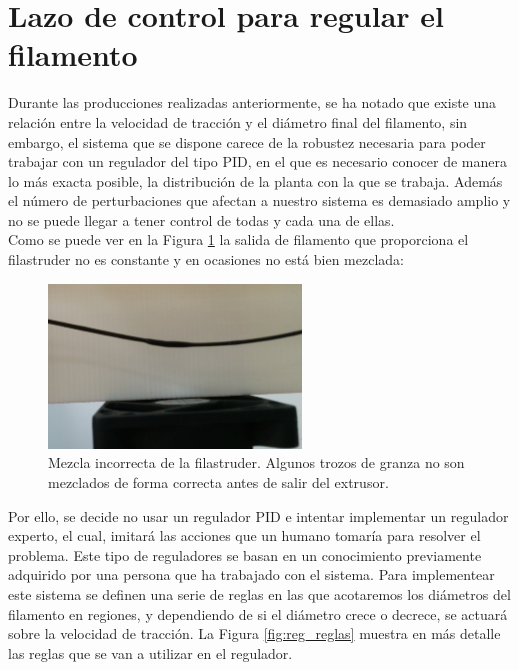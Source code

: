 \section{Lazo de control para regular el filamento}
\label{sec:reg_expt}

Durante las producciones realizadas anteriormente, se ha notado que existe una relación entre la velocidad de tracción y el diámetro final del filamento, sin embargo, el sistema que se dispone carece de la robustez necesaria para poder trabajar con un regulador del tipo PID, en el que es necesario conocer de manera lo más exacta posible, la distribución de la planta con la que se trabaja. Además el número de perturbaciones que afectan a nuestro sistema es demasiado amplio y no se puede llegar a tener control de todas y cada una de ellas.\\

Como se puede ver en la Figura \ref{fig:reg_mezcla} la salida de filamento que proporciona el filastruder no es constante y en ocasiones no está bien mezclada:

\begin{figure}[H]
    \centering
    \includegraphics[width=0.6\textwidth]{images/producciones/22072015/IMG_20150722_120959.jpg}
    \caption[Mezcla incorrecta de la filastruder.]{Mezcla incorrecta de la filastruder. Algunos trozos de granza no son mezclados de forma correcta antes de salir del extrusor.}
    \label{fig:reg_mezcla}
\end{figure}

Por ello, se decide no usar un regulador PID e intentar implementar un regulador experto, el cual, imitará las acciones que un humano tomaría para resolver el problema. Este tipo de reguladores se basan en un conocimiento previamente adquirido por una persona que ha trabajado con el sistema. Para implementear este sistema se definen una serie de reglas en las que acotaremos los diámetros del filamento en regiones, y dependiendo de si el diámetro crece o decrece, se actuará sobre la velocidad de tracción. La Figura \ref{fig:reg_reglas} muestra en más detalle las reglas que se van a utilizar en el regulador.

